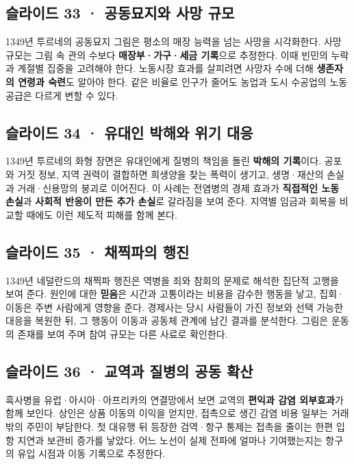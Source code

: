 \documentclass[10pt,a4paper]{article}
\begin{document}
\subsection{슬라이드 33 · 공동묘지와 사망 규모}
1349년 투르네의 공동묘지 그림은 평소의 매장 능력을 넘는 사망을 시각화한다. 사망 규모는 그림 속 관의 수보다 \textbf{매장부·가구·세금 기록}으로 추정한다. 이때 빈민의 누락과 계절별 집중을 고려해야 한다. 노동시장 효과를 살피려면 사망자 수에 더해 \textbf{생존자의 연령과 숙련}도 알아야 한다. 같은 비율로 인구가 줄어도 농업과 도시 수공업의 노동 공급은 다르게 변할 수 있다.\par

\subsection{슬라이드 34 · 유대인 박해와 위기 대응}
1349년 투르네의 화형 장면은 유대인에게 질병의 책임을 돌린 \textbf{박해의 기록}이다. 공포와 거짓 정보, 지역 권력이 결합하면 희생양을 찾는 폭력이 생기고, 생명·재산의 손실과 거래·신용망의 붕괴로 이어진다. 이 사례는 전염병의 경제 효과가 \textbf{직접적인 노동 손실}과 \textbf{사회적 반응이 만든 추가 손실}로 갈라짐을 보여 준다. 지역별 임금과 회복을 비교할 때에도 이런 제도적 피해를 함께 본다.\par

\subsection{슬라이드 35 · 채찍파의 행진}
1349년 네덜란드의 채찍파 행진은 역병을 죄와 참회의 문제로 해석한 집단적 고행을 보여 준다. 원인에 대한 \textbf{믿음}은 시간과 고통이라는 비용을 감수한 행동을 낳고, 집회·이동은 주변 사람에게 영향을 준다. 경제사는 당시 사람들이 가진 정보와 선택 가능한 대응을 복원한 뒤, 그 행동이 이동과 공동체 관계에 남긴 결과를 분석한다. 그림은 운동의 존재를 보여 주며 참여 규모는 다른 사료로 확인한다.\par

\subsection{슬라이드 36 · 교역과 질병의 공동 확산}
흑사병을 유럽·아시아·아프리카의 연결망에서 보면 교역의 \textbf{편익과 감염 외부효과}가 함께 보인다. 상인은 상품 이동의 이익을 얻지만, 접촉으로 생긴 감염 비용 일부는 거래 밖의 주민이 부담한다. 첫 대유행 뒤 등장한 검역·항구 통제는 접촉을 줄이는 한편 입항 지연과 보관비 증가를 낳았다. 어느 노선이 실제 전파에 얼마나 기여했는지는 항구의 유입 시점과 이동 기록으로 추정한다.\par
\end{document}
